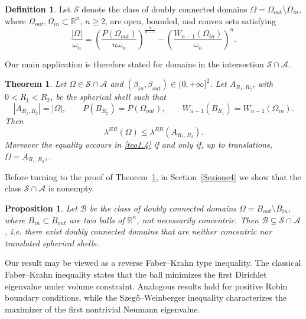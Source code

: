 \documentclass[oneside,a4paper,11pt,notitlepage]{article}
\newcommand{\Hersch}{\mathcal S}
\newcommand{\Simm}{\mathcal A}
\newcommand{\palle}{\mathcal B}
\newcommand{\herintsim}{ \Hersch \cap  \Simm }
\theoremstyle{plain}
\newtheorem{teor}{Theorem}
\numberwithin{teor}{section}
\numberwithin{equation}{section}
\newenvironment{teorema}{\begin{teor}}{\end{teor}}
\theoremstyle{definition}
\newtheorem{defi}[defi]{Definition}
\newenvironment{definizione}{\begin{defi}}{\end{defi}}
\theoremstyle{plain}
\theoremstyle{plain}
\newtheorem{prop}[prop]{Proposition}
\theoremstyle{plain}
\theoremstyle{plain}
\theoremstyle{definition}
\theoremstyle{definition}
\theoremstyle{plain}
\begin{document}
\begin{definizione}
\label{doppioconvessi}
Let $\Hersch$ denote the class of doubly connected domains $\Omega = \Omega_{out} \setminus \overline{\Omega}_{in}$, where $\Omega_{out}, \Omega_{in} \subset \mathbb{R}^n$, $n \ge 2$, are open, bounded, and convex sets satisfying
\begin{equation}
\label{nunziadef}
\frac{|\Omega|}{\omega_n} = \left( \frac{P(\Omega_{out})}{n\omega_n} \right)^{\frac{n}{n-1}} - \left( \frac{W_{n-1}(\Omega_{in})}{\omega_n} \right)^{n}.
\end{equation}
\end{definizione}

Our main application is therefore stated for domains in the intersection $\Hersch \cap \Simm$.

\begin{teorema}\label{thm:main}
Let $\Omega \in \Hersch \cap \Simm$ and $(\beta_{in}, \beta_{out}) \in (0, +\infty]^2$. 
Let $A_{R_1,R_2}$, with $0 < R_1 < R_2$, be the spherical shell such that
\[
|A_{R_1,R_2}| = |\Omega|,\qquad 
P(B_{R_2}) = P(\Omega_{out}),\qquad 
W_{n-1}(B_{R_1}) = W_{n-1}(\Omega_{in}).
\]
Then
\begin{equation}
    \label{teo1.4}
    \lambda^{RR}(\Omega) \le \lambda^{RR}(A_{R_1,R_2}).
\end{equation}
Moreover the equality occours in \eqref{teo1.4} if and only if, up to translations, $\Omega=A_{R_1,R_2},$.
\end{teorema}

Before turning to the proof of Theorem~\ref{thm:main}, in Section~\ref{Sezione4} we show that the class $\Hersch \cap \Simm$ is nonempty.

\begin{prop}
\label{nonempclass}
Let $\palle$ be the class of doubly connected domains $\Omega = B_{out} \setminus \overline{B}_{in}$, where $B_{in}\subset B_{out}$ are two balls of $\mathbb{R}^n$, not necessarily concentric. Then $\palle\subsetneq\herintsim$, i.e. there exist doubly connected domains that are neither
concentric nor translated spherical shells.
\end{prop}

Our result may be viewed as a reverse Faber–Krahn type inequality. The classical Faber–Krahn inequality \cite{faber,krahn} states that the ball minimizes the first Dirichlet eigenvalue under volume constraint. Analogous results hold for positive Robin boundary conditions, while the Szegő–Weinberger inequality characterizes the maximizer of the first nontrivial Neumann eigenvalue.
\end{document}
